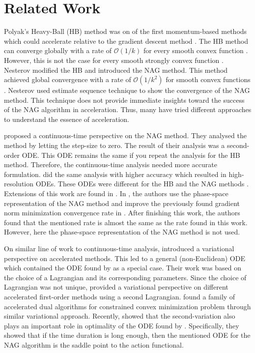 \documentclass{article}
\theoremstyle{plain}
\theoremstyle{definition}
\theoremstyle{remark}
\begin{document}
\section{Related Work}\label{sec_relwork}
Polyak's Heavy-Ball (HB) method was on of the first momentum-based methods which could accelerate relative to the gradient descent method \citep{Polyak1963GradientMF}. The HB method can converge globally with a rate of $\mathcal{O}(1/k)$ for every smooth convex function \citep{7330562}. However, this is not the case for every smooth strongly convex function \citep{Lessard2016AnalysisAD}. Nesterov modified the HB and introduced the NAG method. This method achieved global convergence with a rate of $\mathcal{O}(1/k^2)$ for smooth convex functions \citep{Nesterov1983AMF}. Nesterov used estimate sequence technique to show the convergence of the NAG method. This technique does not provide immediate insights toward the success of the NAG algorithm in acceleration. Thus, many have tried different approaches to understand the essence of acceleration. \par
\citep{JMLR:v17:15-084} proposed a continuous-time perspective on the NAG method. They analysed the method by letting the step-size to zero. The result of their analysis was a second-order ODE. This ODE remains the same if you repeat the analysis for the HB method. Therefore, the continuous-time analysis needed more accurate formulation. \citep{Shi2021UnderstandingTA} did the same analysis with higher accuracy which resulted in high-resolution ODEs. These ODEs were different for the HB and the NAG methods \citep{shi2019acceleration}. Extensions of this work are found in \citep{chen2022gradient,chen2022accelerating}. In \citep{chen2022gradient}, the authors use the phase-space representation of the NAG method and improve the previously found gradient norm minimization convergence rate in \citep{Shi2021UnderstandingTA}. After finishing this work, the authors found that the mentioned rate is almost the same as the rate found in this work. However, here the phase-space representation of the NAG method is not used. \par 
On similar line of work to continuous-time analysis, \citep{WibisonoE7351} introduced a variational perspective on accelerated methods. This led to a general (non-Euclidean) ODE which contained the ODE found by \citep{JMLR:v17:15-084} as a special case. Their work was based on the choice of a Lagrangian and its corresponding parameters. Since the choice of Lagrangian was not unique, \citep{wilson2021lyapunov} provided a variational perspective on different accelerated first-order methods using a second Lagrangian. \citep{7963773} found a family of accelerated dual algorithms for constrained convex minimization problem through similar variational approach. Recently, \citep{zhang2021rethinking} showed that the second-variation also plays an important role in optimality of the ODE found by \citep{JMLR:v17:15-084}. Specifically, they showed that if the time duration is long enough, then the mentioned ODE for the NAG algorithm is the saddle point to the action functional. \par
\end{document}
